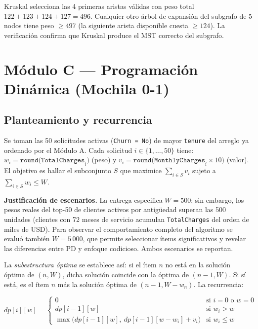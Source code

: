 \documentclass[11pt, a4paper]{article}
\begin{document}
Kruskal selecciona las 4 primeras aristas válidas con peso total
$122+123+124+127=496$. Cualquier otro árbol de expansión del subgrafo de 5 nodos
tiene peso $\geq 497$ (la siguiente arista disponible cuesta $\geq 124$). La
verificación confirma que Kruskal produce el MST correcto del subgrafo.

\section{Módulo C --- Programación Dinámica (Mochila 0-1)}

\subsection{Planteamiento y recurrencia}

Se toman las 50 solicitudes activas (\texttt{Churn = No}) de mayor \texttt{tenure}
del arreglo ya ordenado por el Módulo A. Cada solicitud $i\in\{1,\ldots,50\}$ tiene:
$w_i=\texttt{round(TotalCharges}_i\texttt{)}$ (peso) y
$v_i=\texttt{round(MonthlyCharges}_i\times 10)$ (valor). El objetivo es hallar el
subconjunto $S$ que maximice $\sum_{i\in S}v_i$ sujeto a $\sum_{i\in S}w_i\leq W$.

\textbf{Justificación de escenarios.} La entrega especifica $W=500$; sin embargo,
los pesos reales del top-50 de clientes activos por antigüedad superan las 500
unidades (clientes con 72 meses de servicio acumulan \texttt{TotalCharges} del
orden de miles de USD). Para observar el comportamiento completo del algoritmo se
evaluó también $W=5\,000$, que permite seleccionar ítems significativos y revelar
las diferencias entre PD y enfoque codicioso. Ambos escenarios se reportan.

La \textit{subestructura óptima} se establece así: si el ítem $n$ no está en la solución
óptima de $(n,W)$, dicha solución coincide con la óptima de $(n{-}1,W)$. Si sí está,
es el ítem $n$ más la solución óptima de $(n{-}1,W{-}w_n)$. La recurrencia:

\[
dp[i][w] =
\begin{cases}
  0 & \text{si } i=0 \text{ o } w=0 \\
  dp[i-1][w] & \text{si } w_i > w \\
  \max\!\bigl(dp[i-1][w],\ dp[i-1][w-w_i]+v_i\bigr) & \text{si } w_i \leq w
\end{cases}
\]
\end{document}
